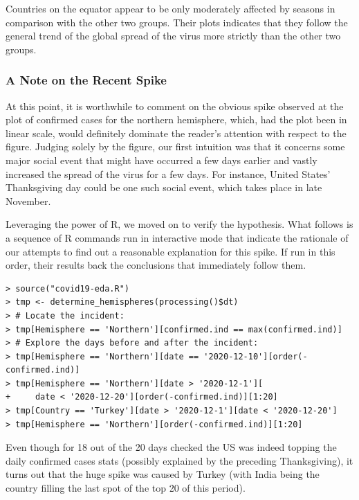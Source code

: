 Countries on the equator appear to be only moderately affected by seasons in comparison with the other two groups.
Their plots indicates that they follow the general trend of the global spread of the virus more strictly than the other two groups.


\subsubsection{A Note on the Recent Spike}

At this point, it is worthwhile to comment on the obvious spike observed at the plot of confirmed cases for the northern hemisphere, which, had the plot been in linear scale, would definitely dominate the reader's attention with respect to the figure.
Judging solely by the figure, our first intuition was that it concerns some major social event that might have occurred a few days earlier and vastly increased the spread of the virus for a few days.
For instance, United States' Thanksgiving day could be one such social event, which takes place in late November.

Leveraging the power of R, we moved on to verify the hypothesis.
What follows is a sequence of R commands run in interactive mode that indicate the rationale of our attempts to find out a reasonable explanation for this spike.
If run in this order, their results back the conclusions that immediately follow them.

\begin{verbatim}
> source("covid19-eda.R")
> tmp <- determine_hemispheres(processing()$dt)
> # Locate the incident:
> tmp[Hemisphere == 'Northern'][confirmed.ind == max(confirmed.ind)]
> # Explore the days before and after the incident:
> tmp[Hemisphere == 'Northern'][date == '2020-12-10'][order(-confirmed.ind)]
> tmp[Hemisphere == 'Northern'][date > '2020-12-1'][
+     date < '2020-12-20'][order(-confirmed.ind)][1:20]
> tmp[Country == 'Turkey'][date > '2020-12-1'][date < '2020-12-20']
> tmp[Hemisphere == 'Northern'][order(-confirmed.ind)][1:20]
\end{verbatim}

Even though for 18 out of the 20 days checked the US was indeed topping the daily confirmed cases stats (possibly explained by the preceding Thanksgiving), it turns out that the huge spike was caused by Turkey (with India being the country filling the last spot of the top 20 of this period).

